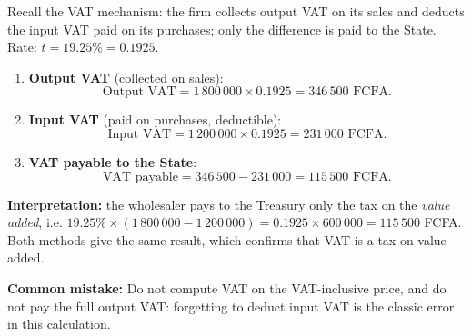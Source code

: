 \documentclass[11pt]{article}
\newcommand{\cle}[1]{{\popxbold\color{popdark}#1}}
\begin{document}
\begin{corrige}
Recall the VAT mechanism: the firm collects \cle{output VAT} on its sales and deducts the \cle{input VAT} paid on its purchases; only the difference is paid to the State. Rate: $t = 19.25\% = 0.1925$.

\begin{enumerate}
\item \textbf{Output VAT} (collected on sales):
\[ \text{Output VAT} = 1\,800\,000 \times 0.1925 = 346\,500 \text{ FCFA}. \]
\item \textbf{Input VAT} (paid on purchases, deductible):
\[ \text{Input VAT} = 1\,200\,000 \times 0.1925 = 231\,000 \text{ FCFA}. \]
\item \textbf{VAT payable to the State}:
\[ \text{VAT payable} = 346\,500 - 231\,000 = 115\,500 \text{ FCFA}. \]
\end{enumerate}

\textbf{Interpretation:} the wholesaler pays to the Treasury only the tax on the \emph{value added}, i.e. $19.25\% \times (1\,800\,000 - 1\,200\,000) = 0.1925 \times 600\,000 = 115\,500$ FCFA. Both methods give the same result, which confirms that VAT is a tax on value added.

\textbf{Common mistake:} Do not compute VAT on the VAT-inclusive price, and do not pay the full output VAT: forgetting to deduct input VAT is the classic error in this calculation.
\end{corrige}
\end{document}
